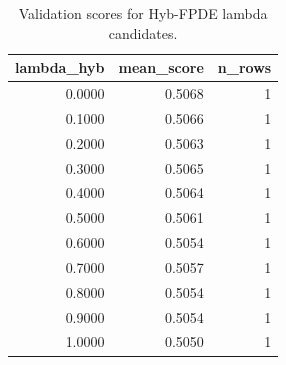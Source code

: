 \begin{table}[t]
\caption{Validation scores for Hyb-FPDE lambda candidates.}
\label{tab:lambda_distribution_computed}
\centering
\begin{tabular}{rrr}
\toprule
lambda\_hyb & mean\_score & n\_rows \\
\midrule
0.0000 & 0.5068 & 1 \\
0.1000 & 0.5066 & 1 \\
0.2000 & 0.5063 & 1 \\
0.3000 & 0.5065 & 1 \\
0.4000 & 0.5064 & 1 \\
0.5000 & 0.5061 & 1 \\
0.6000 & 0.5054 & 1 \\
0.7000 & 0.5057 & 1 \\
0.8000 & 0.5054 & 1 \\
0.9000 & 0.5054 & 1 \\
1.0000 & 0.5050 & 1 \\
\bottomrule
\end{tabular}

\end{table}
